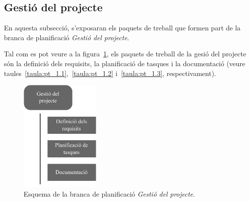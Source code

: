 \documentclass[a4paper,12pt]{ThesisStyle}
\begin{document}
\newpage

\subsection{Gestió del projecte}
\label{subsec:gestio_projecte}

En aquesta subsecció, s'exposaran els paquets de treball que formen part de la branca de planificació \emph{Gestió del projecte}.

Tal com es pot veure a la figura~\ref{img:pt_gestio_projecte}, els paquets de treball de la gesió del projecte són la definició dels requisits, la planificació de tasques i la documentació (veure taules~\ref{taula:pt_1.1},~\ref{taula:pt_1.2} i~\ref{taula:pt_1.3}, respectivament).

\begin{figure}[H]
	\centering
	\includegraphics[width=0.35\textwidth]{assets/working_packages/gestioProjecte.pdf}
	\caption{\label{img:pt_gestio_projecte}Esquema de la branca de planificació \emph{Gestió del projecte}.}
\end{figure}
\end{document}
